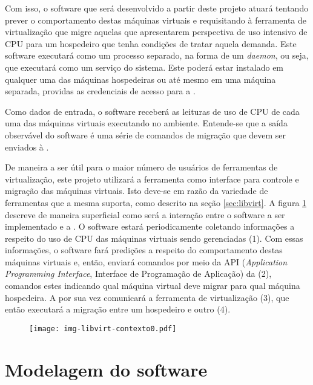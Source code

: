Com isso, o software que será desenvolvido a partir deste projeto atuará
tentando prever o comportamento destas máquinas virtuais e requisitando à
ferramenta de virtualização que migre aquelas que apresentarem perspectiva
de uso intensivo de CPU para um hospedeiro que tenha condições de tratar
aquela demanda. Este software executará como um processo separado, na forma de um
\emph{daemon}, ou seja, que executará como um serviço do sistema. Este poderá
estar instalado em qualquer uma das máquinas hospedeiras ou até mesmo em
uma máquina separada, providas as credenciais de acesso para a \libvirt{}.

Como dados de entrada, o software receberá as leituras de uso de CPU de cada
uma das máquinas virtuais executando no ambiente. Entende-se que a saída
observável do software é uma série de comandos de migração que devem ser
enviados à \libvirt{}.

De maneira a ser útil para o maior número de usuários de ferramentas de
virtualização, este projeto utilizará a ferramenta \libvirt{} como interface
para controle e migração das máquinas virtuais. Isto deve-se em razão da
variedade de ferramentas que a mesma suporta, como descrito na seção
\ref{sec:libvirt}. A figura \ref{fig:libvirtcontexto0} descreve de maneira
superficial como será a interação entre o software a ser implementado e a
\libvirt{}. O software estará periodicamente coletando informações a respeito
do uso de CPU das máquinas virtuais sendo gerenciadas (1). Com essas
informações, o software fará predições a respeito do comportamento destas
máquinas virtuais e, então, enviará comandos por meio da API (\emph{Application
Programming Interface}, Interface de Programação de Aplicação) da \libvirt{}
(2), comandos estes indicando qual máquina virtual deve migrar para qual
máquina hospedeira. A \libvirt{} por sua vez comunicará a ferramenta de
virtualização (3), que então executará a migração entre um hospedeiro e outro
(4).

\begin{figure}[htp]
\centering
\texttt{[image: img-libvirt-contexto0.pdf]}
\label{fig:libvirtcontexto0}
\end{figure}


\section{Modelagem do software}\label{sec:modelagem}

